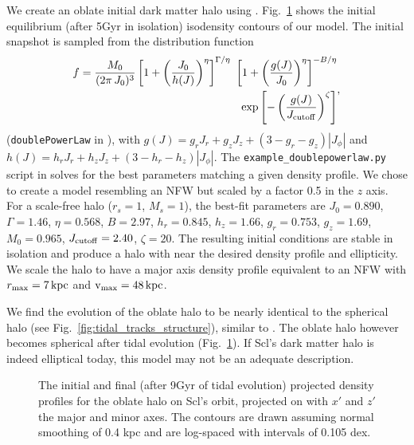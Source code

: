 We create an oblate initial dark matter halo using \agama{}.
Fig.~\ref{fig:oblate_i_f} shows the initial equilibrium (after 5Gyr in
isolation) isodensity contours of our model. The initial snapshot is
sampled from the distribution function \begin{equation}{
\begin{split}
f = \frac{M_0}{(2\pi\,J_0)^3} \left[1 + \left(\frac{J_0}{h(J)}\right)^\eta\right]^{\Gamma / \eta} \ \left[1 + \left(\frac{g(J)}{J_0}\right)^\eta\right]^{-B/\eta} \\ \ \exp\left[-\left(\frac{g(J)}{J_{\rm cutoff}} \right)^\zeta\right] 
\end{split},
}\end{equation} (\texttt{doublePowerLaw} in \agama{}), with
\(g(J) = g_r J_r + g_z J_z + (3-g_r - g_z) |J_\phi|\) and
\(h(J) = h_rJ_r + h_zJ_z + (3-h_r-h_z) |J_\phi|\). The
\texttt{example\_doublepowerlaw.py} script in \agama{} solves for the
best parameters matching a given density profile. We chose to create a
model resembling an NFW but scaled by a factor 0.5 in the \(z\) axis.
For a scale-free halo (\(r_s=1\), \(M_s=1\)), the best-fit parameters
are \(J_0=0.890\), \(\Gamma=1.46\), \(\eta=0.568\), \(B=2.97\),
\(h_r=0.845\), \(h_z=1.66\), \(g_r=0.753\), \(g_z=1.69\), \(M_0=0.965\),
\(J_{\rm cutoff}=2.40\), \(\zeta=20\). The resulting initial conditions
are stable in isolation and produce a halo with near the desired density
profile and ellipticity. We scale the halo to have a major axis density
profile equivalent to an NFW with \(r_{\rm max} = 7\,{\rm kpc}\) and
\({\rm v}_{\rm max}=48\,{\rm kpc}\).

We find the evolution of the oblate halo to be nearly identical to the
spherical halo (see Fig.~\ref{fig:tidal_tracks_structure}), similar to
\citet{battaglia+sollima+nipoti2015}. The oblate halo however becomes
spherical after tidal evolution (Fig.~\ref{fig:oblate_i_f}). If Scl's
dark matter halo is indeed elliptical today, this model may not be an
adequate description.

\begin{figure}
\centering
{}
\caption[Oblate halo before and after tidal evolution]{The initial and
final (after 9Gyr of tidal evolution) projected density profiles for the
oblate halo on Scl's \smallperi{} orbit, projected on with \(x'\) and
\(z'\) the major and minor axes. The contours are drawn assuming normal
smoothing of 0.4 kpc and are log-spaced with intervals of 0.105
dex.}\label{fig:oblate_i_f}
\end{figure}

